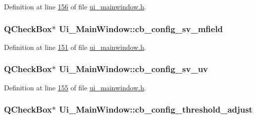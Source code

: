 Definition at line \hyperlink{a00139_source_l00156}{156} of file \hyperlink{a00139_source}{ui\+\_\+mainwindow.\+h}.

\hypertarget{a00080_a0a83284035ab2dbaeb39946522434986}{
\subsubsection[{cb\+\_\+config\+\_\+sv\+\_\+mfield}]{\setlength{\rightskip}{0pt plus 5cm}Q\+Check\+Box$\ast$ Ui\+\_\+\+Main\+Window\+::cb\+\_\+config\+\_\+sv\+\_\+mfield}}\label{a00080_a0a83284035ab2dbaeb39946522434986}


Definition at line \hyperlink{a00139_source_l00151}{151} of file \hyperlink{a00139_source}{ui\+\_\+mainwindow.\+h}.

\hypertarget{a00080_a3a93cd0a3f3738aad252d063a8677839}{
\subsubsection[{cb\+\_\+config\+\_\+sv\+\_\+uv}]{\setlength{\rightskip}{0pt plus 5cm}Q\+Check\+Box$\ast$ Ui\+\_\+\+Main\+Window\+::cb\+\_\+config\+\_\+sv\+\_\+uv}}\label{a00080_a3a93cd0a3f3738aad252d063a8677839}


Definition at line \hyperlink{a00139_source_l00155}{155} of file \hyperlink{a00139_source}{ui\+\_\+mainwindow.\+h}.

\hypertarget{a00080_a433ffc427e1103e6c2939f949ee5e5b5}{
\subsubsection[{cb\+\_\+config\+\_\+threshold\+\_\+adjust}]{\setlength{\rightskip}{0pt plus 5cm}Q\+Check\+Box$\ast$ Ui\+\_\+\+Main\+Window\+::cb\+\_\+config\+\_\+threshold\+\_\+adjust}}\label{a00080_a433ffc427e1103e6c2939f949ee5e5b5}


